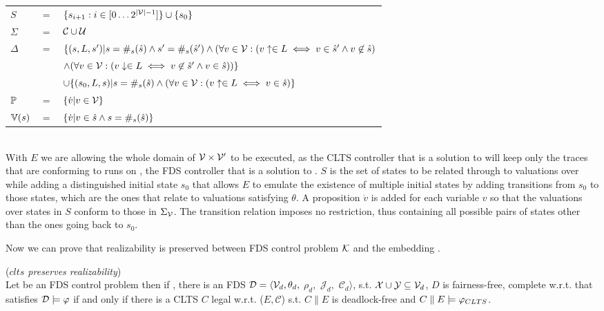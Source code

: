 \vspace{1em}
\begin{tabular}{ l c l }
	$S$ &$=$& $\{s_{i+1} : i \in [0\ldots2^{|{\mathcal{V}}|-1}] \}\cup \{s_0\}$\\
	$\Sigma$ &$=$&$\mathcal{C} \cup \mathcal{U}$\\	
	$\Delta$&$=$&$\{(s,L,s') | s = \#_s(\hat{s}) \wedge  s' = \#_s(\hat{s}') \wedge (\forall v \in {\ensuremath{\mathcal{V}}}: (v\uparrow \in L \iff v \in \hat{s}' \wedge v \not\in \hat{s})$\\
	&&$\wedge (\forall v \in {\ensuremath{\mathcal{V}}}: (v\downarrow \in L \iff v \not\in \hat{s}' \wedge v \in \hat{s}))\}$\\
	&&$\cup \{ (s_0,L,s)| s = \#_s(\hat{s}) \wedge (\forall v \in {\ensuremath{\mathcal{V}}}: (v\uparrow \in L \iff v \in \hat{s})\}$\\
	$\mathbb{P}$&$=$&$\{\dot{v} | v \in {\ensuremath{\mathcal{V}}}\}$\\
	$\mathbb{V}(s)$&$=$&$\{\dot{v}| v \in \hat{s} \wedge s = \#_s(\hat{s})\}$\\
\end{tabular}
\vspace{1em}
\\
With $E$ we are allowing the whole domain of ${\mathcal{V}} \times {\ensuremath{\mathcal{V}}}'$ to be executed, as the CLTS controller that is a solution to \cltsCPEmbedding will keep only the traces that are conforming to runs on \fdsD, the FDS controller that is a solution to \fdsControlProblem. $S$ is the set of states to be related through \enumStateSetDef to valuations over \gsV while adding a distinguished initial state $s_0$ that allows $E$ to emulate the existence of multiple initial states by adding transitions from $s_0$ to those states, which are the ones that relate to valuations satisfying $\theta$. A proposition $\dot{v}$ is added for each variable $v$ so that the valuations over states in $S$ conform to those in $\Sigma_{{\mathcal{V}}}$. The transition relation imposes no restriction, thus containing all possible pairs of states other than the ones going back to $s_0$.

Now we can prove that realizability is preserved between FDS control problem $\mathcal{K}$ and the embedding \cltsCPEmbedding.

\begin{theorem}(\emph{$clts$ preserves realizability})\label{theorem:clts_preserves_realizability}\\
	Let \fdsControlProblemDef be an FDS control problem  then if \cltsCPEmbeddingDef, there is an FDS $\mathcal{D}= \langle \mathcal{V}_d, \theta_d,$ $\rho_d,$ $\mathcal{J}_d,$ $\mathcal{C}_d\rangle$, s.t. ${\mathcal{X}} \cup {\ensuremath{\mathcal{Y}}} \subseteq \mathcal{V}_d$, $D$ is fairness-free, complete w.r.t. \gsX that satisfies $\mathcal{D} \models \varphi$
	if and only if there is a CLTS $C$ legal w.r.t. ($E,\mathcal{C}$) s.t. $C \parallel E$ is deadlock-free and $C \parallel E \models \varphi_{CLTS}$.
	\normalsize
\end{theorem}

